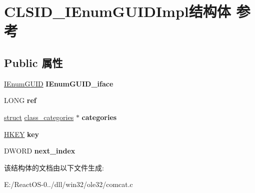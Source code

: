 \hypertarget{struct_c_l_s_i_d___i_enum_g_u_i_d_impl}{}\section{C\+L\+S\+I\+D\+\_\+\+I\+Enum\+G\+U\+I\+D\+Impl结构体 参考}
\label{struct_c_l_s_i_d___i_enum_g_u_i_d_impl}
\subsection*{Public 属性}
\begin{DoxyCompactItemize}
\item 
\mbox{\label{struct_c_l_s_i_d___i_enum_g_u_i_d_impl_a1deefb55031c67ee4b1c9b43bdd87e2a}} 
\hyperlink{interface_i_enum_g_u_i_d}{I\+Enum\+G\+U\+ID} {\bfseries I\+Enum\+G\+U\+I\+D\+\_\+iface}
\item 
\mbox{\label{struct_c_l_s_i_d___i_enum_g_u_i_d_impl_a387e3c43e2bc3e9832a840d8fc6c7ea0}} 
L\+O\+NG {\bfseries ref}
\item 
\mbox{\label{struct_c_l_s_i_d___i_enum_g_u_i_d_impl_aad10323991a8a2afbdd52c195f6c611c}} 
\hyperlink{interfacestruct}{struct} \hyperlink{structclass__categories}{class\+\_\+categories} $\ast$ {\bfseries categories}
\item 
\mbox{\label{struct_c_l_s_i_d___i_enum_g_u_i_d_impl_a9300ccc8c139c1e2fad058e153dd7a30}} 
\hyperlink{interfacevoid}{H\+K\+EY} {\bfseries key}
\item 
\mbox{\label{struct_c_l_s_i_d___i_enum_g_u_i_d_impl_a0f5f7ad2790b4e4fef8b6de806cc7440}} 
D\+W\+O\+RD {\bfseries next\+\_\+index}
\end{DoxyCompactItemize}


该结构体的文档由以下文件生成\+:\begin{DoxyCompactItemize}
\item 
E\+:/\+React\+O\+S-\/0../dll/win32/ole32/comcat.\+c\end{DoxyCompactItemize}

